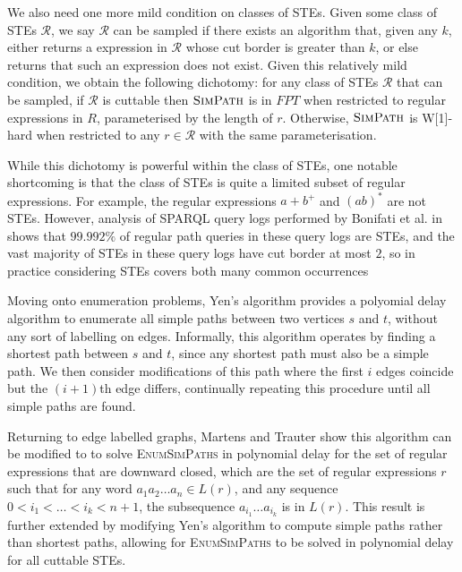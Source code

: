 \documentclass{article}
\begin{document}
We also need one more mild condition on classes of STEs. Given some class of STEs $\mathcal{R}$, we say $\mathcal{R}$ can be sampled if there exists an algorithm that, given any $k$, either returns a expression in $\mathcal{R}$ whose cut border is greater than $k$, or else returns that such an expression does not exist. Given this relatively mild condition, we obtain the following dichotomy: for any class of STEs $\mathcal{R}$ that can be sampled, if $\mathcal{R}$ is cuttable then $\textsc{SimPath}$ is in $FPT$ when restricted to regular expressions in $R$, parameterised by the length of $r$. Otherwise, $\textsc{SimPath}$ is W[1]-hard when restricted to any $r \in \mathcal{R}$ with the same parameterisation.

While this dichotomy is powerful within the class of STEs, one notable shortcoming is that the class of STEs is quite a limited subset of regular expressions. For example, the regular expressions $a + b^+$ and $(ab)^*$ are not STEs. However, analysis of SPARQL query logs performed by Bonifati et al. in \cite{bonifatiAnalyticalStudyLarge2020} shows that $99.992\%$ of regular path queries in these query logs are STEs, and the vast majority of STEs in these query logs have cut border at most $2$, so in practice considering STEs covers both many common occurrences

Moving onto enumeration problems, Yen's algorithm \cite{yenFindingShortestLoopless1971} provides a polyomial delay algorithm to enumerate all simple paths between two vertices $s$ and $t$, without any sort of labelling on edges. Informally, this algorithm operates by finding a shortest path between $s$ and $t$, since any shortest path must also be a simple path. We then consider modifications of this path where the first $i$ edges coincide but the $(i+1)$th edge differs, continually repeating this procedure until all simple paths are found.

Returning to edge labelled graphs, Martens and Trauter show this algorithm can be modified to to solve \textsc{EnumSimPaths} in polynomial delay for the set of regular expressions that are downward closed, which are the set of regular expressions $r$ such that for any word $a_1 a_2 \dots a_n \in L(r)$, and any sequence $0 < i_1 < \dots < i_k < n + 1$, the subsequence $a_{i_1} \dots a_{i_k}$ is in $L(r)$. This result is further extended by modifying Yen's algorithm to compute simple paths rather than shortest paths, allowing for \textsc{EnumSimPaths} to be solved in polynomial delay for all cuttable STEs.
\end{document}
